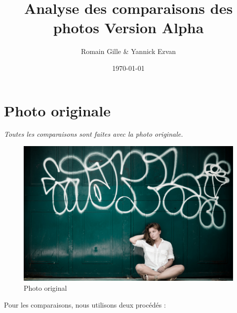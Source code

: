 \documentclass[]{article}
\title{Analyse des comparaisons des photos Version Alpha}
\author{Romain Gille \& Yannick Ezvan}
\date{\today}
\begin{document}
\maketitle

{
\hypersetup{linkcolor=black}
\setcounter{tocdepth}{3}
\tableofcontents
}

\newpage

\section{Photo originale}\label{photo-originale}

\emph{Toutes les comparaisons sont faites avec la photo originale.}

\begin{figure}[htbp]
\centering
\includegraphics{photos/original.jpg}
\caption{Photo original}
\end{figure}

Pour les comparaisons, nous utilisons deux procédés :
\end{document}
